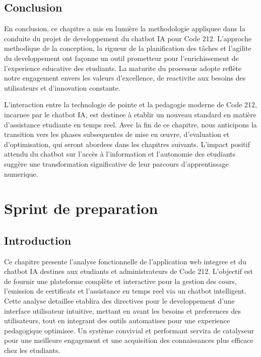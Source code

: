 \documentclass[a4paper, 11pt, openany]{report}
\begin{document}
\section{Conclusion}
En conclusion, ce chapitre a mis en lumière la methodologie appliquee dans la conduite du projet de developpement du chatbot IA pour Code 212. L'approche methodique de la conception, la rigueur de la planification des tâches et l'agilite du developpement ont façonne un outil prometteur pour l'enrichissement de l'experience educative des etudiants. La maturite du processus adopte reflète notre engagement envers les valeurs d'excellence, de reactivite aux besoins des utilisateurs et d'innovation constante.

L'interaction entre la technologie de pointe et la pedagogie moderne de Code 212, incarnee par le chatbot IA, est destinee à etablir un nouveau standard en matière d'assistance etudiante en temps reel. Avec la fin de ce chapitre, nous anticipons la transition vers les phases subsequentes de mise en œuvre, d'evaluation et d'optimisation, qui seront abordees dans les chapitres suivants. L'impact positif attendu du chatbot sur l'accès à l'information et l'autonomie des etudiants suggère une transformation significative de leur parcours d'apprentissage numerique.

\chapter{Sprint de preparation}

\section{Introduction}
Ce chapitre presente l'analyse fonctionnelle de l'application web integree et du chatbot IA destines aux etudiants et administrateurs de Code 212. L'objectif est de fournir une plateforme complète et interactive pour la gestion des cours, l'emission de certificats et l'assistance en temps reel via un chatbot intelligent. Cette analyse detaillee etablira des directives pour le developpement d'une interface utilisateur intuitive, mettant en avant les besoins et preferences des utilisateurs, tout en integrant des outils automatises pour une experience pedagogique optimisee. Un système convivial et performant servira de catalyseur pour une meilleure engagement et une acquisition des connaissances plus efficace chez les etudiants.
\end{document}
